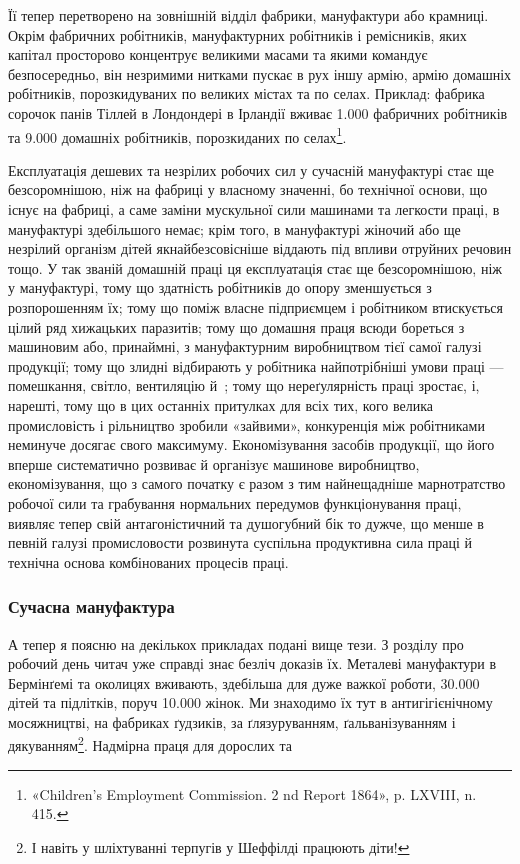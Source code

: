 \parcont{}  %
Її тепер перетворено на зовнішній відділ фабрики, мануфактури
або крамниці. Окрім фабричних робітників, мануфактурних робітників
і ремісників, яких капітал просторово концентрує великими
масами та якими командує безпосередньо, він незримими
нитками пускає в рух іншу армію, армію домашніх робітників,
порозкидуваних по великих містах та по селах. Приклад: фабрика
сорочок панів Тіллей в Лондондері в Ірландії вживає \num{1.000} фабричних
робітників та \num{9.000} домашніх робітників, порозкиданих по
селах\footnote{
«Children’s Employment Commission. 2 nd Report 1864»,
p. LXVIII, n. 415.
}.

Експлуатація дешевих та незрілих робочих сил у сучасній
мануфактурі стає ще безсоромнішою, ніж на фабриці у власному
значенні, бо технічної основи, що існує на фабриці, а саме заміни
мускульної сили машинами та легкости праці, в мануфактурі
здебільшого немає; крім того, в мануфактурі жіночий або ще
незрілий організм дітей якнайбезсовісніше віддають під впливи
отруйних речовин тощо. У так званій домашній праці ця експлуатація
стає ще безсоромнішою, ніж у мануфактурі, тому що здатність
робітників до опору зменшується з розпорошенням їх;
тому що поміж власне підприємцем і робітником втискується цілий
ряд хижацьких паразитів; тому що домашня праця всюди бореться
з машиновим або, принаймні, з мануфактурним виробництвом тієї
самої галузі продукції; тому що злидні відбирають у робітника
найпотрібніші умови праці — помешкання, світло, вентиляцію
й~; тому що нереґулярність праці зростає, і, нарешті, тому
що в цих останніх притулках для всіх тих, кого велика промисловість
і рільництво зробили «зайвими», конкуренція між робітниками
неминуче досягає свого максимуму. Економізування
засобів продукції, що його вперше систематично розвиває й
організує машинове виробництво, економізування, що з самого
початку є разом з тим найнещадніше марнотратство робочої
сили та грабування нормальних передумов функціонування праці,
виявляє тепер свій антагоністичний та душогубний бік то дужче,
що менше в певній галузі промисловости розвинута суспільна
продуктивна сила праці й технічна основа комбінованих процесів
праці.

\subsubsection{Сучасна мануфактура}

А тепер я поясню на декількох прикладах подані вище тези.
З розділу про робочий день читач уже справді знає безліч доказів
їх. Металеві мануфактури в Бермінґемі та околицях вживають,
здебільша для дуже важкої роботи, \num{30.000} дітей та підлітків,
поруч \num{10.000} жінок. Ми знаходимо їх тут в антигігієнічному
мосяжництві, на фабриках ґудзиків, за ґлязуруванням, ґальванізуванням
і дякуванням\footnote{
І навіть у шліхтуванні терпугів у Шеффілді працюють діти!
}. Надмірна праця для дорослих та
\parbreak{}  %
